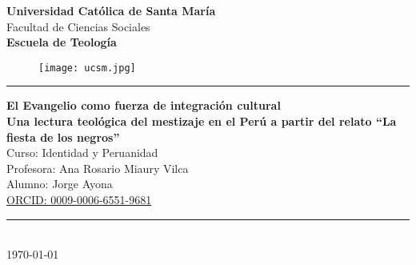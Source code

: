\begin{titlepage}
	\begin{center}
		\huge \textbf{Universidad Católica de Santa María}\\[1cm]
		\large Facultad de Ciencias Sociales\\[3mm]
		\textbf{Escuela de Teología}\\[3mm]
		
		\begin{figure}[h]
			\centering
			\texttt{[image: ucsm.jpg]}
		\end{figure}
		
		\vspace{3mm}
		\textcolor{cato}{\rule{\linewidth}{0.5mm}}
		
		\vspace{4mm}
		{\large\textbf{
			El Evangelio como fuerza de integración cultural\\
			Una lectura teológica del mestizaje en el Perú a partir del relato “La fiesta de los negros”
		}}\\
		
		\vspace{5mm}
		\large{Curso: Identidad y Peruanidad}\\[2mm]
		\large{Profesora: Ana Rosario Miaury Vilca}\\[2mm]
		\large{Alumno: Jorge Ayona}\\
		\href{https://orcid.org/0009-0006-6551-9681}{ORCID: 0009-0006-6551-9681}\\[4mm]
		
		\textcolor{cato}{\rule{\linewidth}{0.5mm}}\\[2mm]
		{\large \today}
	\end{center}
\end{titlepage}
